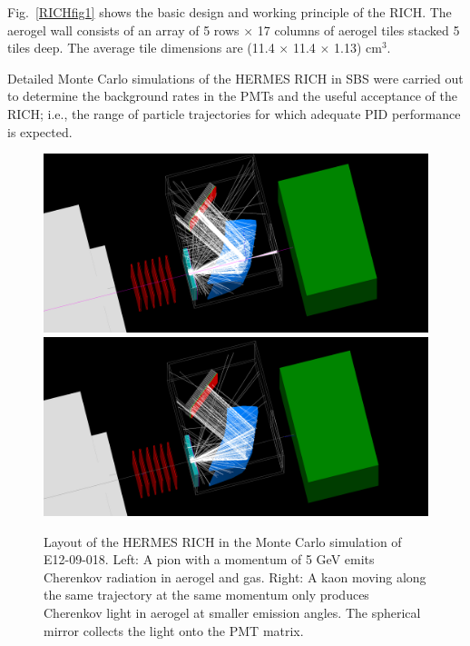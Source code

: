 Fig.~\ref{RICHfig1} shows the basic design and working principle of the RICH. The aerogel wall consists of an array of 5 rows $\times$ 17 columns of aerogel tiles stacked 5 tiles deep. The average tile dimensions are (11.4 $\times$ 11.4 $\times$ 1.13) cm$^3$. %

Detailed Monte Carlo simulations of the HERMES RICH in SBS were carried out to determine the background rates in the PMTs and the useful acceptance of the RICH; i.e., the range of particle trajectories for which adequate PID performance is expected.
\begin{figure}[h]
  \begin{center}
    \includegraphics[width=.48\textwidth]{figures/RICH_5GEV_pion.png}
    \includegraphics[width=.48\textwidth]{figures/RICH_5GEV_kaon.png}
  \end{center}
  \caption{\label{RICHG4} Layout of the HERMES RICH in the Monte Carlo simulation of E12-09-018. Left: A pion with a momentum of 5 GeV emits Cherenkov radiation in aerogel and gas. Right: A kaon moving along the same trajectory at the same momentum only produces Cherenkov light in aerogel at smaller emission angles. The spherical mirror collects the light onto the PMT matrix. }
\end{figure}
